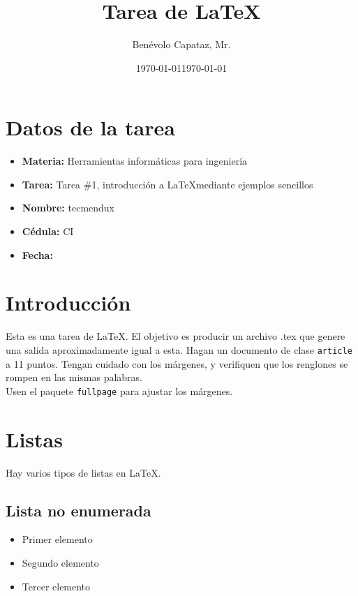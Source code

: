 \documentclass[11pt]{article}
\title{Tarea de \LaTeX}
\author{Benévolo Capataz, Mr.}
\date{\today}
\begin{document}
    \maketitle

    \section{\Large Datos de la tarea}
    
        \begin{itemize}
            \renewcommand{\labelitemi}{\tiny\raisebox{0.5ex}{{$\blacksquare$}}}
            
            \item \textbf{Materia:} Herramientas informáticas para ingeniería
            \item \textbf{Tarea:} Tarea \#1, introducción a \LaTeX mediante ejemplos sencillos
            \item \textbf{Nombre:} tecmendux 
            \item \textbf{Cédula:} CI 
            \item \textbf{Fecha:} \date{\today}  
            
        \end{itemize}

    \section{\Large Introducción} \vspace{-10pt}
        Esta es una tarea de \LaTeX. El objetivo es producir un archivo .tex que genere una salida
        aproximadamente igual a esta. Hagan un documento de clase {\tt article} a 11 puntos. Tengan
        cuidado con los márgenes, y verifiquen que los renglones se rompen en las mismas palabras.
        \\ [5pt]
        Usen el paquete {\tt fullpage} para ajustar los márgenes.


    \section{\Large Listas} \vspace{-10pt}
        Hay varios tipos de listas en \LaTeX.

        \subsection{\Large Lista no enumerada}
            \begin{itemize}[leftmargin=2cm]
                \renewcommand{\labelitemi}{\tiny\raisebox{0.5ex}{{$\blacksquare$}}}
                \item Primer elemento
                \item Segundo elemento
                \item Tercer elemento
            \end{itemize}
            
\end{document}
